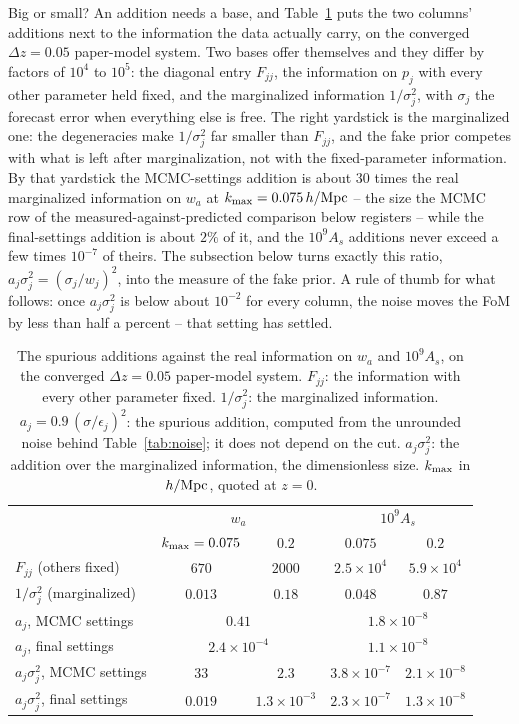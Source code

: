 \documentclass[11pt]{article}
\newcommand{\kmax}{k_{\rm max}}
\newcommand{\hMpc}{\,h/{\rm Mpc}}
\begin{document}
Big or small?  An addition needs a base, and
Table~\ref{tab:yardstick} puts the two columns' additions next to
the information the data actually carry, on the converged
$\Delta z = 0.05$ paper-model system.  Two bases offer themselves
and they differ by factors of $10^4$ to $10^5$: the diagonal entry
$F_{jj}$, the information on $p_j$ with every other parameter held
fixed, and the marginalized information $1/\sigma_j^2$, with
$\sigma_j$ the forecast error when everything else is free.  The
right yardstick is the marginalized one: the degeneracies make
$1/\sigma_j^2$ far smaller than $F_{jj}$, and the fake prior
competes with what is left after marginalization, not with the
fixed-parameter information.  By that yardstick the MCMC-settings
addition is about $30$ times the real marginalized information on
$w_a$ at $\kmax = 0.075\hMpc$ -- the size the MCMC row of the
measured-against-predicted comparison below registers -- while
the final-settings addition is about $2\%$ of it, and the
$10^9 A_s$ additions never exceed a few times $10^{-7}$ of theirs.
The subsection below turns exactly this ratio,
$a_j\sigma_j^2 = (\sigma_j/w_j)^2$, into the measure of the fake
prior.  A rule of thumb for what follows: once $a_j\sigma_j^2$ is
below about $10^{-2}$ for every column, the noise moves the FoM by
less than half a percent -- that setting has settled.

\begin{table}[tbp]
  \centering
  \begin{tabular}{lcccc}
    \hline
    & \multicolumn{2}{c}{$w_a$} & \multicolumn{2}{c}{$10^9 A_s$} \\
    & $\kmax = 0.075$ & $0.2$ & $0.075$ & $0.2$ \\
    \hline
    $F_{jj}$ (others fixed)       & $670$   & $2000$ & $2.5\times10^{4}$ & $5.9\times10^{4}$ \\
    $1/\sigma_j^2$ (marginalized) & $0.013$ & $0.18$ & $0.048$ & $0.87$ \\
    $a_j$, MCMC settings          & \multicolumn{2}{c}{$0.41$} & \multicolumn{2}{c}{$1.8\times10^{-8}$} \\
    $a_j$, final settings         & \multicolumn{2}{c}{$2.4\times10^{-4}$} & \multicolumn{2}{c}{$1.1\times10^{-8}$} \\
    $a_j\sigma_j^2$, MCMC settings  & $33$    & $2.3$ & $3.8\times10^{-7}$ & $2.1\times10^{-8}$ \\
    $a_j\sigma_j^2$, final settings & $0.019$ & $1.3\times10^{-3}$ & $2.3\times10^{-7}$ & $1.3\times10^{-8}$ \\
    \hline
  \end{tabular}
  \caption{The spurious additions against the real information on
    $w_a$ and $10^9 A_s$, on the converged $\Delta z = 0.05$
    paper-model system.  $F_{jj}$: the information with every other
    parameter fixed.  $1/\sigma_j^2$: the marginalized information.
    $a_j = 0.9\,(\sigma/\epsilon_j)^2$: the spurious addition,
    computed from the unrounded noise behind Table~\ref{tab:noise};
    it does not depend on the cut.  $a_j\sigma_j^2$: the addition
    over the marginalized information, the dimensionless size.
    $\kmax$ in $\hMpc$, quoted at $z = 0$.}
  \label{tab:yardstick}
\end{table}
\end{document}
